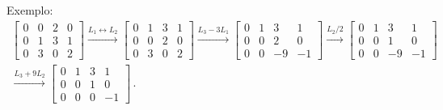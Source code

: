 \documentclass[12pt,a4paper]{report}
\begin{document}
Exemplo:
\begin{multline*}
  \begin{bmatrix}
    0&0&2&0\\
    0&1&3&1\\
    0&3&0&2
  \end{bmatrix}\xrightarrow{L_1\leftrightarrow L_2} \begin{bmatrix}
    0&1&3&1\\
    0&0&2&0\\
    0&3&0&2
\end{bmatrix}\xrightarrow{L_3-3L_1} \begin{bmatrix}
  0&1&3&1\\
  0&0&2&0\\
  0&0&-9&-1
\end{bmatrix}\xrightarrow{L_2/2}\begin{bmatrix}
  0&1&3&1\\
  0&0&1&0\\
  0&0&-9&-1
\end{bmatrix}\\
\xrightarrow{L_3+9L_2}\begin{bmatrix}
  0&1&3&1\\
  0&0&1&0\\
  0&0&0&-1
\end{bmatrix}\,.
\end{multline*}
\end{document}
